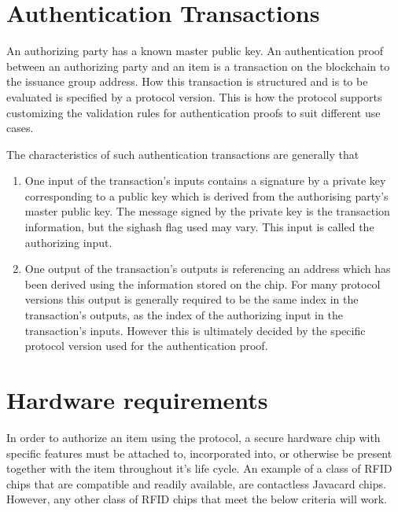 \documentclass[twocolumn,titlepage]{article}
\begin{document}
\section{Authentication Transactions}
An authorizing party has a known master public key. An authentication proof between an authorizing party and an item is a transaction on the blockchain to the issuance group address. How this transaction is structured and is to be evaluated is specified by a protocol version. This is how the protocol supports customizing the validation rules for authentication proofs to suit different use cases.

The characteristics of such authentication transactions are generally that
\begin{enumerate}
    \item One input of the transaction’s inputs contains a signature by a private key corresponding to a public key which is derived from the authorising party’s master public key. The message signed by the private key is the transaction information, but the sighash flag used may vary. This input is called the authorizing input.
    \item One output of the transaction’s outputs is referencing an address which has been derived using the information stored on the chip. For many protocol versions this output is generally required to be the same index in the transaction’s outputs, as the index of the authorizing input in the transaction’s inputs. However this is ultimately decided by the specific protocol version used for the authentication proof. 
\end{enumerate}

\section{Hardware requirements}

In order to authorize an item using the protocol, a secure hardware chip with specific features must be attached to, incorporated into, or otherwise be present together with the item throughout it's life cycle. An example of a class of RFID chips that are compatible and readily available, are contactless Javacard chips. However, any other class of RFID chips that meet the below criteria will work.
\end{document}
